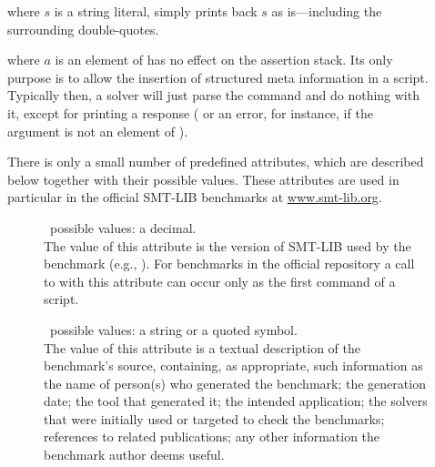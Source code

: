 \begin{description}

%
\item[] 
where $s$ is a string literal, simply prints back $s$ as is---including 
the surrounding double-quotes.
\smallskip

%
\item[] where $a$ is an element of 
has no effect on the assertion stack.
Its only purpose is to allow the insertion of structured meta information 
in a script.
Typically then, a solver will just parse the command and do nothing with it, 
except for printing a response ( or an error, for instance,
if the argument is not an element of ).

There is only a small number of predefined  attributes,
which are described below together with their possible values.
These attributes are used in particular in the official SMT-LIB benchmarks
at \href{http://www.smt-lib.org/benchmarks.shtml}{www.smt-lib.org}.

\begin{description}
\item[] \ 
possible values: a decimal.
\\
The value of this attribute is the version of SMT-LIB used by the benchmark (e.g., ).
For benchmarks in the official repository a call to \ter{set-info} with this attribute can occur only as the first command of a script.

\item[] \ 
possible values: a string or a quoted symbol.
\\
The value of this attribute is a textual description of the benchmark's source,
containing, as appropriate, such information as
the name of person(s) who generated the benchmark;
the generation date; %
the tool that generated it;
the intended application;
the solvers that were initially used or targeted to check the benchmarks;
references to related publications; 
any other information the benchmark author deems useful.


\end{description}
\end{description}
